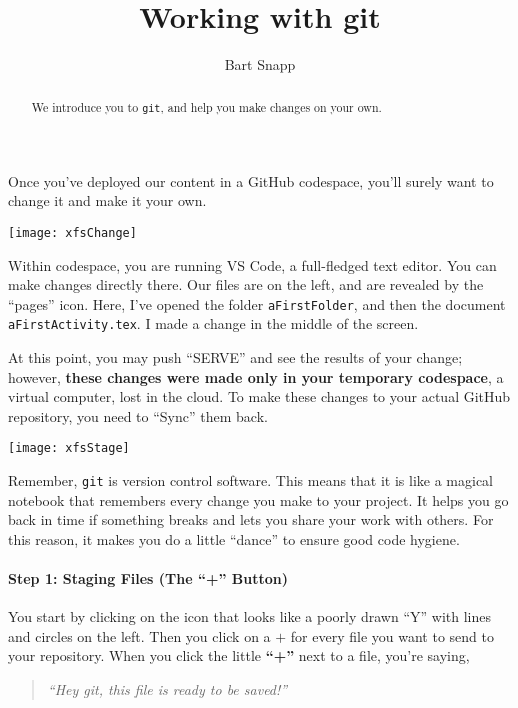 \documentclass{ximera}
\author{Bart Snapp}
\title{Working with git}
\begin{document}
\pdfOnly{\onecolumn}
\begin{abstract}
    We introduce you to \texttt{git}, and help you make changes on your own.
\end{abstract}
\maketitle
Once you've deployed our content in a GitHub codespace, you'll surely want to
change it and  make it your own.
\begin{image}
    \texttt{[image: xfsChange]}
\end{image}
    Within codespace, you are running VS Code, a
    full-fledged text editor. You can make changes directly there. Our files
    are on
    the left, and are revealed by the ``pages'' icon.
    Here, I've opened the folder \verb!aFirstFolder!, and then the document
    \verb!aFirstActivity.tex!. I made a change in the middle of the screen.

    At this point, you may push ``SERVE'' and see the results of your change;
    however, \textbf{these changes were made only in your temporary codespace},
    a
    virtual
    computer, lost in the cloud. To make these changes to your actual GitHub
    repository, you need to ``Sync'' them back.
\pdfOnly{\end{multicols}}

\newpage

\begin{image}
    \texttt{[image: xfsStage]}
\end{image}

    Remember, \verb!git! is version control software. This means that it is like a magical notebook that remembers every change you
    make to your
    project. It helps you go back in time if something breaks and lets you
    share
    your work with others. For this reason, it makes you do a little ``dance''
    to ensure good code hygiene.

    \paragraph{Step 1: Staging Files (The ``+'' Button)}

    You start by clicking on the icon that looks like a poorly drawn ``Y'' with
    lines and circles on the left. Then you click on a $+$ for every file you
    want
    to send to your repository.  When you click the little \textbf{``+''} next
    to a
    file, you're saying,
    \begin{quote}
        \emph{``Hey git, this file is ready to be saved!''}
    \end{quote}
\end{document}
